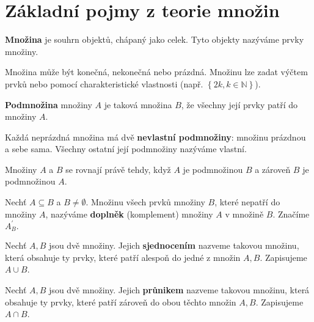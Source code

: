 \section{Základní pojmy z teorie množin}


\begin{definition}
  \textbf{Množina} je souhrn objektů, chápaný jako celek. Tyto objekty nazýváme prvky množiny.
\end{definition}

\begin{pozn}
Množina může být konečná, nekonečná nebo prázdná. Množinu lze zadat výčtem prvků nebo pomocí charakteristické vlastnosti (např. $\left \{ 2k, k \in \mathbb{N}\right\}$).

\end{pozn}

\begin{definition}
  \textbf{Podmnožina} množiny $A$ je taková množina $B$, že všechny její prvky patří do množiny $A$.
\end{definition}

\begin{pozn}
Každá neprázdná množina má dvě \textbf{nevlastní podmnožiny}: množinu prázdnou a sebe sama. Všechny ostatní její podmnožiny nazýváme vlastní.

\end{pozn}
\begin{definition}
  Množiny $A$ a $B$ se rovnají právě tehdy, když $A$ je podmnožinou $B$ a zároveň $B$ je podmnožinou $A$.
\end{definition}

\begin{definition}
  Nechť $A \subseteq B$ a $B\neq \emptyset$. Množinu všech prvků množiny $B$, které nepatří do množiny $A$, nazýváme \textbf{doplněk} (komplement) množiny $A$ v množině $B$. Značíme $A_B^\prime.$
\end{definition}

\begin{definition}
  Nechť $A, B$ jsou dvě množiny. Jejich \textbf{sjednocením} nazveme takovou množinu, která obsahuje ty prvky, které patří alespoň do jedné z množin $A, B$. Zapisujeme $A \cup B$.
\end{definition}

\begin{definition}
  Nechť $A, B$ jsou dvě množiny. Jejich \textbf{průnikem} nazveme takovou množinu, která obsahuje ty prvky, které patří zároveň do obou těchto množin $A, B$. Zapisujeme $A \cap B$.
\end{definition}

